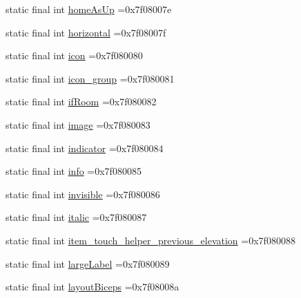\begin{DoxyCompactItemize}
static final int \mbox{\hyperlink{classcom_1_1example_1_1trainawearapplication_1_1_r_1_1id_acb29ee6fde4129f605fc1d716917b8ee}{home\+As\+Up}} =0x7f08007e
\item 
static final int \mbox{\hyperlink{classcom_1_1example_1_1trainawearapplication_1_1_r_1_1id_a27cc31ad74828c3a7b6be0cc6d47a7e6}{horizontal}} =0x7f08007f
\item 
static final int \mbox{\hyperlink{classcom_1_1example_1_1trainawearapplication_1_1_r_1_1id_aec4eb7f6b0d8cfb4974a1747d6d7cd8e}{icon}} =0x7f080080
\item 
static final int \mbox{\hyperlink{classcom_1_1example_1_1trainawearapplication_1_1_r_1_1id_a78be192ba6dea4ce17a713436a4c4401}{icon\+\_\+group}} =0x7f080081
\item 
static final int \mbox{\hyperlink{classcom_1_1example_1_1trainawearapplication_1_1_r_1_1id_a718a520b853a2b6af5b529386bbc9b0f}{if\+Room}} =0x7f080082
\item 
static final int \mbox{\hyperlink{classcom_1_1example_1_1trainawearapplication_1_1_r_1_1id_ade240531ae1a005175e96abe48ed7fa4}{image}} =0x7f080083
\item 
static final int \mbox{\hyperlink{classcom_1_1example_1_1trainawearapplication_1_1_r_1_1id_a9c61c3e1f6c436ffed5092d24b977536}{indicator}} =0x7f080084
\item 
static final int \mbox{\hyperlink{classcom_1_1example_1_1trainawearapplication_1_1_r_1_1id_a41dfa8afb64beed53b2b8a2d037c317f}{info}} =0x7f080085
\item 
static final int \mbox{\hyperlink{classcom_1_1example_1_1trainawearapplication_1_1_r_1_1id_a2623ef8dc40544674fd54673227374e9}{invisible}} =0x7f080086
\item 
static final int \mbox{\hyperlink{classcom_1_1example_1_1trainawearapplication_1_1_r_1_1id_a636b38f93b74d519c7100458f5b02cca}{italic}} =0x7f080087
\item 
static final int \mbox{\hyperlink{classcom_1_1example_1_1trainawearapplication_1_1_r_1_1id_a7f7883d7dbebf1cabba23f5d7c3add56}{item\+\_\+touch\+\_\+helper\+\_\+previous\+\_\+elevation}} =0x7f080088
\item 
static final int \mbox{\hyperlink{classcom_1_1example_1_1trainawearapplication_1_1_r_1_1id_a6f27b36ed3dd53214e78e18d9a1a5d5f}{large\+Label}} =0x7f080089
\item 
static final int \mbox{\hyperlink{classcom_1_1example_1_1trainawearapplication_1_1_r_1_1id_afedeccbb846e0bb5d65306d266de0485}{layout\+Biceps}} =0x7f08008a
\item 

\end{DoxyCompactItemize}
